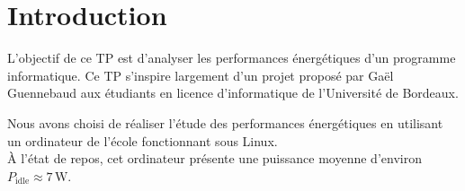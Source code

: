 \section{Introduction}

L'objectif de ce TP est d'analyser les performances énergétiques d'un programme informatique. Ce TP s'inspire largement d'un projet proposé par Gaël Guennebaud aux étudiants en licence d'informatique de l'Université de Bordeaux.

Nous avons choisi de réaliser l'étude des performances énergétiques en utilisant un ordinateur de l'école fonctionnant sous Linux.\\
À l'état de repos, cet ordinateur présente une puissance moyenne d'environ \( P_{\text{idle}} \approx 7\,\text{W} \).
